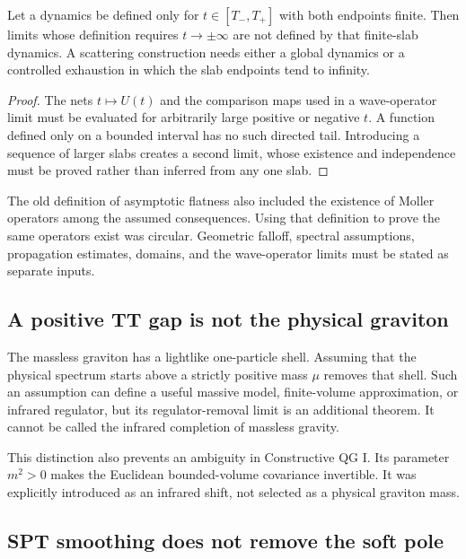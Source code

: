 \documentclass[11pt]{article}
\begin{document}
\begin{proposition}
Let a dynamics be defined only for $t\in[T_-,T_+]$ with both endpoints finite.
Then limits whose definition requires $t\to\pm\infty$ are not defined by that
finite-slab dynamics. A scattering construction needs either a global
dynamics or a controlled exhaustion in which the slab endpoints tend to
infinity.
\end{proposition}

\begin{proof}
The nets $t\mapsto U(t)$ and the comparison maps used in a wave-operator limit
must be evaluated for arbitrarily large positive or negative $t$. A function
defined only on a bounded interval has no such directed tail. Introducing a
sequence of larger slabs creates a second limit, whose existence and
independence must be proved rather than inferred from any one slab.
\end{proof}

The old definition of asymptotic flatness also included the existence of
Moller operators among the assumed consequences. Using that definition to
prove the same operators exist was circular. Geometric falloff, spectral
assumptions, propagation estimates, domains, and the wave-operator limits must
be stated as separate inputs.

\subsection{A positive TT gap is not the physical graviton}

The massless graviton has a lightlike one-particle shell. Assuming that the
physical spectrum starts above a strictly positive mass $\mu$ removes that
shell. Such an assumption can define a useful massive model, finite-volume
approximation, or infrared regulator, but its regulator-removal limit is an
additional theorem. It cannot be called the infrared completion of massless
gravity.

This distinction also prevents an ambiguity in Constructive QG I. Its
parameter $m^2>0$ makes the Euclidean bounded-volume covariance invertible. It
was explicitly introduced as an infrared shift, not selected as a physical
graviton mass.

\subsection{SPT smoothing does not remove the soft pole}
\end{document}
